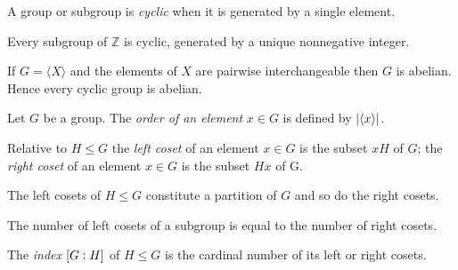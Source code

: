 \begin{definition}
	A group or subgroup is \emph{cyclic} when it is generated by a single element.
\end{definition}

\vspace{2mm}

\begin{proposition}
	Every subgroup of $\mathbb{Z}$ is cyclic, generated by a unique nonnegative integer.
\end{proposition}

\vspace{2mm}

\begin{proposition}
	If $G = \langle X \rangle$ and the elements of $X$ are pairwise interchangeable then $G$ is abelian. Hence every cyclic group is abelian.
\end{proposition}

\vspace{2mm}

\begin{definition}
	Let $G$ be a group. The \emph{order of an element} $x \in G$ is defined by $\abs[0]{\langle x \rangle}$.
\end{definition}

\vspace{2mm}

\begin{definition}
	Relative to $H \leq G$ the \emph{left coset} of an element $x \in G$ is the subset $xH$ of $G$; the \emph{right coset} of an element $x \in G$ is the subset $Hx$ of G.
\end{definition}

\vspace{2mm}

\begin{proposition}
	The left cosets of $H \leq G$ constitute a partition of $G$ and so do the right cosets.	
\end{proposition}

\vspace{2mm}

\begin{proposition}
	The number of left cosets of a subgroup is equal to the number of right cosets.
\end{proposition}

\vspace{2mm}

\begin{definition}
	The \emph{index} $\intcc{G:H}$ of $H \leq G$ is the cardinal number of its left or right cosets.
\end{definition}

